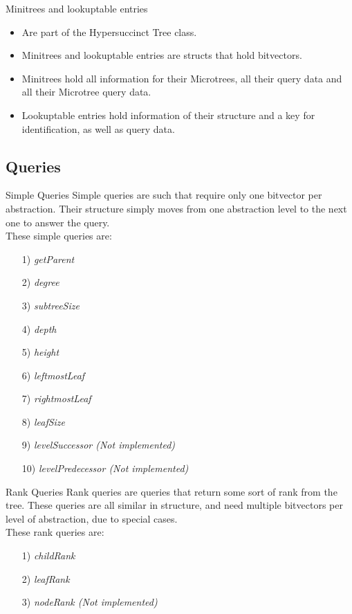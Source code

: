\documentclass{beamer}
\begin{document}
\begin{frame}{Minitrees and lookuptable entries}
	\begin{itemize}
	\item
		Are part of the Hypersuccinct Tree class.
	\item
		Minitrees and lookuptable entries are structs that hold bitvectors.
	\item
		Minitrees hold all information for their Microtrees, all their query data and all their Microtree query data.
	\item
		Lookuptable entries hold information of their structure and a key for identification, as well as query data.
	\end{itemize}
\end{frame}



\subsection{Queries}

\begin{frame}{Simple Queries}
	Simple queries are such that require only one bitvector per abstraction. Their structure simply moves from one abstraction level to the next one to answer the query.\\
	These simple queries are:
	\begin{itemize}
	\item[1)] \textit{getParent}
	\item[2)] \textit{degree}
	\item[3)] \textit{subtreeSize}
	\item[4)] \textit{depth}
	\item[5)] \textit{height}
	\item[6)] \textit{leftmostLeaf}
	\item[7)] \textit{rightmostLeaf}
	\item[8)] \textit{leafSize}
	\item[9)] \textit{levelSuccessor (Not implemented)}
	\item[10)] \textit{levelPredecessor (Not implemented)}
	\end{itemize}
\end{frame}

\begin{frame}{Rank Queries}
	Rank queries are queries that return some sort of rank from the tree. These queries are all similar in structure, and need multiple bitvectors per level of abstraction, due to special cases.\\
	These rank queries are:
	\begin{itemize}
	\item[1)] \textit{childRank}
	\item[2)] \textit{leafRank}
	\item[3)] \textit{nodeRank (Not implemented)}
	\end{itemize}
\end{frame}
\end{document}
